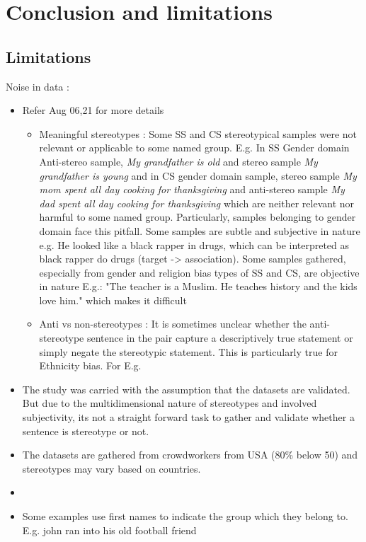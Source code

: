 \chapter{Conclusion and limitations}

\section{Limitations}\label{limitations}
Noise in data :
\begin{itemize}
    \item Refer \cite{blodgett2021stereotyping} Aug 06,21 for more details 
    \begin{itemize}
        \item Meaningful stereotypes : Some SS and CS stereotypical samples  were not relevant or applicable to some named group. E.g. In SS   Gender domain Anti-stereo sample, \textit{ My grandfather is old} and stereo sample \textit{My grandfather is young} and in CS gender domain sample, stereo sample \textit{My mom spent all day cooking for thanksgiving} and anti-stereo sample \textit{My dad spent all day cooking for thanksgiving} which are neither relevant nor harmful to some named group. Particularly, samples belonging to gender domain face this pitfall. Some samples are subtle and subjective in nature e.g. He looked like a black rapper in drugs, which can be interpreted as black rapper do drugs (target -> association). Some samples gathered, especially from gender and religion bias types of SS and CS, are objective in nature E.g.: "The teacher is a Muslim. He teaches history and the kids love him." which makes it difficult 
        \item Anti vs non-stereotypes : It is sometimes unclear whether the anti-stereotype sentence in the pair capture a descriptively true statement or simply negate the stereotypic statement. This is particularly true for Ethnicity bias. For E.g. 
    \end{itemize}
    \item The study was carried with the assumption that the datasets are validated. But due to the multidimensional nature of stereotypes and involved subjectivity, its not a straight forward task to gather and validate whether a sentence is stereotype or not.  
    \item The datasets are gathered from crowdworkers from USA (80\% below 50) and stereotypes may vary based on countries. 
    \item 
    \item Some examples use first names to indicate the group which they belong to.
    E.g. john ran into his old football friend
\end{itemize}

